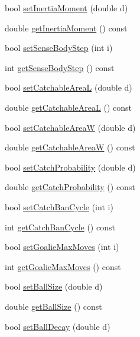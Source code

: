 \begin{DoxyCompactItemize}
\item 
bool \hyperlink{classServerSettings_a88b46ac9b950305b86fc0bfe8f145b8e}{set\+Inertia\+Moment} (double d)
\item 
double \hyperlink{classServerSettings_acb21f27205d41a287323d4737e763196}{get\+Inertia\+Moment} () const 
\item 
bool \hyperlink{classServerSettings_a49603fbf8bea502452a2fe2284cc9cb2}{set\+Sense\+Body\+Step} (int i)
\item 
int \hyperlink{classServerSettings_a6a84482c9fcc5b304e2fa41c3eb2e86c}{get\+Sense\+Body\+Step} () const 
\item 
bool \hyperlink{classServerSettings_ab097d1a65525c5851f95507e3d7fa667}{set\+Catchable\+AreaL} (double d)
\item 
double \hyperlink{classServerSettings_acfbe824ae58e9803c8599b3dfbef7622}{get\+Catchable\+AreaL} () const 
\item 
bool \hyperlink{classServerSettings_ade7c654db3622d374e694b13245d9edb}{set\+Catchable\+AreaW} (double d)
\item 
double \hyperlink{classServerSettings_a10896e44a2695024a51b3ff3810f3138}{get\+Catchable\+AreaW} () const 
\item 
bool \hyperlink{classServerSettings_a6f9218ce9e9b4d4d3964be0ffe3f11d6}{set\+Catch\+Probability} (double d)
\item 
double \hyperlink{classServerSettings_a17a67611271faf4b7117b49ba451c0d1}{get\+Catch\+Probability} () const 
\item 
bool \hyperlink{classServerSettings_aaa383bc64b5e6b690d2bbff840fc94e3}{set\+Catch\+Ban\+Cycle} (int i)
\item 
int \hyperlink{classServerSettings_a5524e22ab9bf17d9c24cb2350cf49d27}{get\+Catch\+Ban\+Cycle} () const 
\item 
bool \hyperlink{classServerSettings_ac7340a63321971a2f450bfff00eaa996}{set\+Goalie\+Max\+Moves} (int i)
\item 
int \hyperlink{classServerSettings_a841626ede1c968880e40cb9e18d4e57f}{get\+Goalie\+Max\+Moves} () const 
\item 
bool \hyperlink{classServerSettings_ace618332a7e47d535e150ef73eff5f54}{set\+Ball\+Size} (double d)
\item 
double \hyperlink{classServerSettings_a0a0b193b7d1936ba103f4bd80eb1dd11}{get\+Ball\+Size} () const 
\item 
bool \hyperlink{classServerSettings_ad2f70db19ec4be940be6882dfbd0810b}{set\+Ball\+Decay} (double d)
\item 

\end{DoxyCompactItemize}
